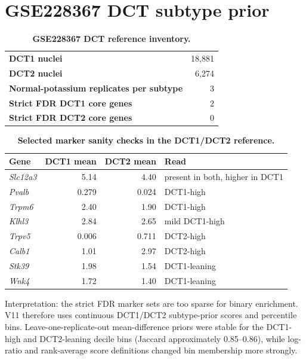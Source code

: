 \documentclass[10pt]{article}
\newcommand{\gene}[1]{\textit{#1}}
\begin{document}
\section{GSE228367 DCT subtype prior}

\begin{table}[H]
\centering\small
\caption{\textbf{GSE228367 DCT reference inventory.}}
\label{tab:dctinventory}
\begin{tabularx}{0.78\textwidth}{>{\bfseries}p{}r}
\toprule
DCT1 nuclei & 18,881 \\
DCT2 nuclei & 6,274 \\
Normal-potassium replicates per subtype & 3 \\
Strict FDR DCT1 core genes & 2 \\
Strict FDR DCT2 core genes & 0 \\
\bottomrule
\end{tabularx}
\end{table}

\begin{table}[H]
\centering\small
\caption{\textbf{Selected marker sanity checks in the DCT1/DCT2 reference.}}
\label{tab:dctmarkers}
\begin{tabular}{lrrl}
\toprule
Gene & DCT1 mean & DCT2 mean & Read \\
\midrule
\gene{Slc12a3} & 5.14 & 4.40 & present in both, higher in DCT1 \\
\gene{Pvalb} & 0.279 & 0.024 & DCT1-high \\
\gene{Trpm6} & 2.40 & 1.90 & DCT1-high \\
\gene{Klhl3} & 2.84 & 2.65 & mild DCT1-high \\
\gene{Trpv5} & 0.006 & 0.711 & DCT2-high \\
\gene{Calb1} & 1.01 & 2.97 & DCT2-high \\
\gene{Stk39} & 1.98 & 1.54 & DCT1-leaning \\
\gene{Wnk4} & 1.72 & 1.40 & DCT1-leaning \\
\bottomrule
\end{tabular}
\end{table}

\noindent
Interpretation: the strict FDR marker sets are too sparse for binary enrichment. V11 therefore uses continuous DCT1/DCT2 subtype-prior scores and percentile bins. Leave-one-replicate-out mean-difference priors were stable for the DCT1-high and DCT2-leaning decile bins (Jaccard approximately 0.85--0.86), while log-ratio and rank-average score definitions changed bin membership more strongly.
\end{document}
